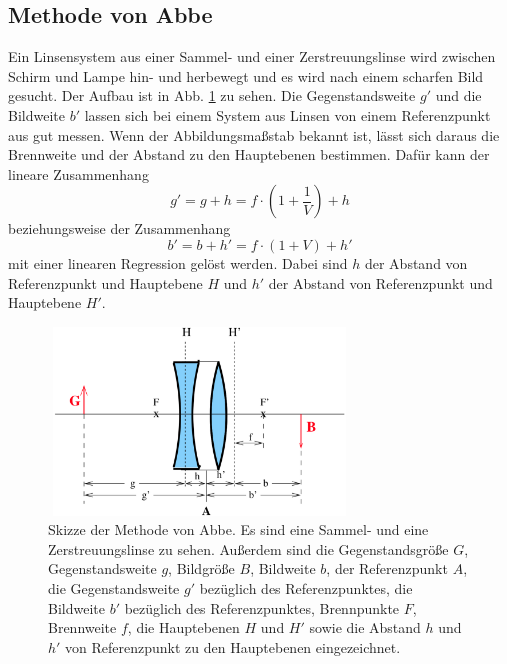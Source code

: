 \subsection{Methode von Abbe}
Ein Linsensystem aus einer Sammel- und einer Zerstreuungslinse wird zwischen Schirm und Lampe hin- und herbewegt und es wird nach einem scharfen Bild gesucht. Der Aufbau ist in Abb. \ref{fig:abbe} zu sehen.
Die Gegenstandsweite $g'$ und die Bildweite $b'$ lassen sich bei einem System aus Linsen von einem Referenzpunkt aus gut messen. 
Wenn der Abbildungsmaßstab bekannt ist, lässt sich daraus die Brennweite und der Abstand zu den Hauptebenen bestimmen. 
Dafür kann der lineare Zusammenhang 
\begin{equation}
    g' = g + h = f \cdot \left(1 + \frac{1}{V} \right) + h
    \label{eqn:gstrich}
\end{equation}
beziehungsweise der Zusammenhang 
\begin{equation}
    b' = b + h' = f \cdot \left(1 + V \right) + h'
    \label{eqn:bstrich}
\end{equation}
mit einer linearen Regression gelöst werden. 
Dabei sind $h$ der Abstand von Referenzpunkt und Hauptebene $H$ und $h'$ der Abstand von Referenzpunkt und Hauptebene $H'$.

\begin{figure}
    \centering
    \includegraphics[width=8cm, height=5cm]{build/abbe.png}
    \caption{Skizze der Methode von Abbe. Es sind eine Sammel- und eine Zerstreuungslinse zu sehen. Außerdem sind die Gegenstandsgröße $G$, Gegenstandsweite $g$, Bildgröße $B$, Bildweite $b$, der Referenzpunkt $A$, die Gegenstandsweite $g'$ bezüglich des Referenzpunktes, die Bildweite $b'$ bezüglich des Referenzpunktes, Brennpunkte $F$, Brennweite $f$, die Hauptebenen $H$ und $H'$ sowie die Abstand $h$ und $h'$ von Referenzpunkt zu den Hauptebenen eingezeichnet. \cite{V408}}
    \label{fig:abbe}
\end{figure}
